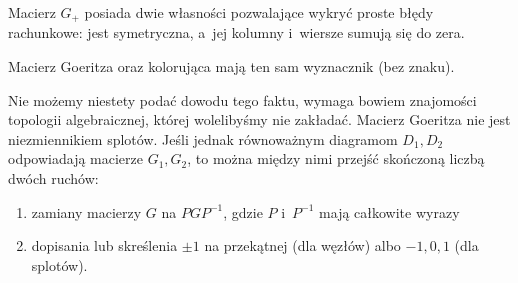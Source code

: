 Macierz $G_+$ posiada dwie własności pozwalające wykryć proste błędy rachunkowe: jest symetryczna, a~jej kolumny i~wiersze sumują się do zera.

\begin{proposition}
    Macierz Goeritza oraz kolorująca mają ten sam wyznacznik (bez znaku).
\end{proposition}

Nie możemy niestety podać dowodu tego faktu, wymaga bowiem znajomości topologii algebraicznej, której wolelibyśmy nie zakładać.
Macierz Goeritza nie jest niezmiennikiem splotów.
Jeśli jednak równoważnym diagramom $D_1, D_2$ odpowiadają macierze $G_1, G_2$, to można między nimi przejść skończoną liczbą dwóch ruchów:
\begin{enumerate}[leftmargin=*]
\itemsep0em
    \item zamiany macierzy $G$ na $PGP^{-1}$, gdzie $P$ i~$P^{-1}$ mają całkowite wyrazy
    \item dopisania lub skreślenia $\pm 1$ na przekątnej (dla węzłów) albo $-1, 0, 1$ (dla splotów).
\end{enumerate}




